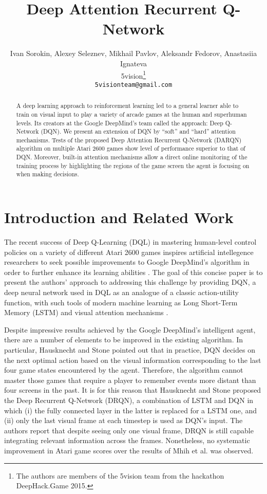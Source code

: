 \documentclass{article} \usepackage{nips15submit_e,times}
\title{Deep Attention Recurrent Q-Network}
\author{
Ivan Sorokin, Alexey Seleznev, Mikhail Pavlov, Aleksandr Fedorov, Anastasiia Ignateva \\
5vision\thanks{The authors are members of the 5vision team from the hackathon DeepHack.Game 2015.} \\
\texttt{5visionteam@gmail.com} \\
}
\begin{document}
\maketitle

\begin{abstract}
  A deep learning approach to reinforcement learning led to a general
  learner able to train on visual input to play a variety of arcade
  games at the human and superhuman levels. Its creators at the Google
  DeepMind's  team  called the  approach:  Deep Q-Network (DQN). We
  present an extension of DQN by ``soft'' and ``hard'' attention mechanisms.
  Tests of  the proposed  Deep Attention  Recurrent Q-Network (DARQN) algorithm on multiple Atari 2600 games show level
  of  performance  superior  to that of DQN. Moreover,  built-in
  attention  mechanisms  allow  a  direct  online  monitoring  of the
  training process by highlighting the  regions of the game screen the
  agent is focusing on when making decisions.
\end{abstract}

\section{Introduction and Related Work}

The recent success of Deep Q-Learning (DQL) in mastering human-level control policies on a variety of different Atari 2600 games \cite{mnih2015human} inspires artificial intellegence researchers to seek possible improvements to Google DeepMind's algorithm in order to further enhance its learning abilities \cite{hausknecht2015drqn, nair2015massively, Hasselt2015deep}. The goal of this concise paper is to present the authors' approach to addressing this challenge by providing DQN,
a deep neural network used in DQL as an analogue of a classic action-utility function, with such tools of modern machine learning as Long Short-Term Memory (LSTM) \cite{hochreiter1997LSTM} and visual attention mechanisms \cite{xu2015show, mnih2014ram, ba2015attention}.

Despite impressive results achieved by the Google DeepMind's intelligent agent, there are a number of elements to be improved in the existing 
algorithm. In particular, Hausknecht and Stone \cite{hausknecht2015drqn} pointed out that in practice, DQN decides on the next optimal 
action based on the visual information corresponding to the last four game states encountered by the agent. Therefore, the algorithm cannot 
master those games that require a player to remember events more distant than four screens in the past. It is for this reason that Hausknecht 
and Stone proposed the Deep Recurrent Q-Network (DRQN), a combination of LSTM and DQN in which (i) the fully connected layer in the latter is 
replaced for a LSTM one, and (ii) only the last visual frame at each timestep is used as DQN's input. The authors report that despite seeing 
only one visual frame, DRQN is still capable integrating relevant information across the frames. Nonetheless, no systematic improvement
in Atari game scores over the results of Mhih et al. \cite{mnih2015human} was observed.
\end{document}
